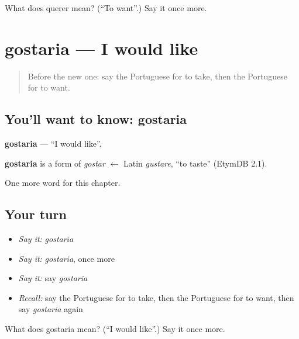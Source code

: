 \begin{tcolorbox}[breakable,colback=teal!4,colframe=teal!35!black,title={Before you move on}]
What does querer mean? (\textquotedblleft{}To want\textquotedblright{}.) Say it once more.
\end{tcolorbox}
\section[gostaria]{gostaria — I would like}

\label{lesson:PT-C83-gostaria}



\begin{quote}
Before the new one: say the Portuguese for to take, then the Portuguese for to want.
\end{quote}

\subsection*{You'll want to know: gostaria}
\textbf{gostaria} — \textquotedblleft{}I would like\textquotedblright{}.

\begin{cousinweb}
\textbf{gostaria} is a form of \emph{gostar} $\leftarrow$ Latin \emph{gustare}, \textquotedblleft{}to taste\textquotedblright{} (EtymDB 2.1).
\end{cousinweb}

\begin{grammarlens}[title={What you've built}]
One more word for this chapter.
\end{grammarlens}

\subsection*{Your turn}
\begin{itemize}
\raggedright
  \item \emph{Say it:} \emph{gostaria}
  \item \emph{Say it:} \emph{gostaria}, once more
  \item \emph{Say it:} say \emph{gostaria}
  \item \emph{Recall:} say the Portuguese for to take, then the Portuguese for to want, then say \emph{gostaria} again
\end{itemize}

\begin{tcolorbox}[breakable,colback=teal!4,colframe=teal!35!black,title={Before you move on}]
What does gostaria mean? (\textquotedblleft{}I would like\textquotedblright{}.) Say it once more.
\end{tcolorbox}
